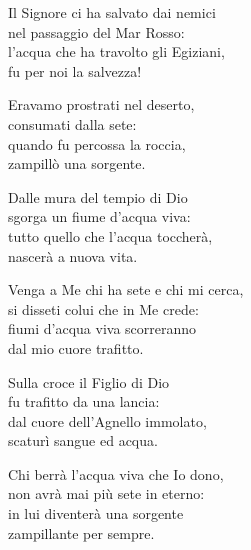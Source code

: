 
\strofa Il Signore ci ha salvato dai nemici\\
nel passaggio del Mar Rosso:\\
l'acqua che ha travolto gli Egiziani,\\
fu per noi la salvezza!

\spazio


\spazio

\strofa Eravamo prostrati nel deserto,\\
consumati dalla sete:\\
quando fu percossa la roccia,\\
zampillò una sorgente.

\spazio


\spazio

\strofa Dalle mura del tempio di Dio\\
sgorga un fiume d'acqua viva:\\
tutto quello che l'acqua toccherà,\\
nascerà a nuova vita.

\spazio


\spazio

\strofa Venga a Me chi ha sete e chi mi cerca,\\
si disseti colui che in Me crede:\\
fiumi d'acqua viva scorreranno\\
dal mio cuore trafitto.

\spazio


\spazio

\strofa Sulla croce il Figlio di Dio\\
fu trafitto da una lancia:\\
dal cuore dell'Agnello immolato,\\
scaturì sangue ed acqua.

\spazio


\spazio

\strofa Chi berrà l'acqua viva che Io dono,\\
non avrà mai più sete in eterno:\\
in lui diventerà una sorgente\\
zampillante per sempre.

\spazio


